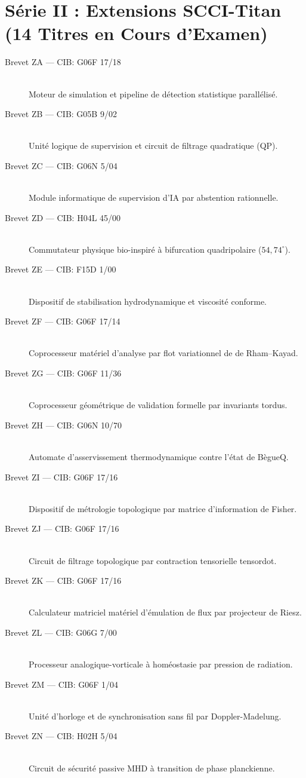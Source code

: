 \section*{Série II : Extensions SCCI-Titan (14 Titres en Cours d'Examen)}
\begin{description}
    \item[Brevet ZA --- CIB: G06F 17/18] \hfill \\ Moteur de simulation et pipeline de détection statistique parallélisé.
    \item[Brevet ZB --- CIB: G05B 9/02] \hfill \\ Unité logique de supervision et circuit de filtrage quadratique (QP).
    \item[Brevet ZC --- CIB: G06N 5/04] \hfill \\ Module informatique de supervision d'IA par abstention rationnelle.
    \item[Brevet ZD --- CIB: H04L 45/00] \hfill \\ Commutateur physique bio-inspiré à bifurcation quadripolaire ($54,74^\circ$).
    \item[Brevet ZE --- CIB: F15D 1/00] \hfill \\ Dispositif de stabilisation hydrodynamique et viscosité conforme.
    \item[Brevet ZF --- CIB: G06F 17/14] \hfill \\ Coprocesseur matériel d'analyse par flot variationnel de de Rham–Kayad.
    \item[Brevet ZG --- CIB: G06F 11/36] \hfill \\ Coprocesseur géométrique de validation formelle par invariants tordus.
    \item[Brevet ZH --- CIB: G06N 10/70] \hfill \\ Automate d'asservissement thermodynamique contre l'état de BègueQ.
    \item[Brevet ZI --- CIB: G06F 17/16] \hfill \\ Dispositif de métrologie topologique par matrice d'information de Fisher.
    \item[Brevet ZJ --- CIB: G06F 17/16] \hfill \\ Circuit de filtrage topologique par contraction tensorielle tensordot.
    \item[Brevet ZK --- CIB: G06F 17/16] \hfill \\ Calculateur matriciel matériel d'émulation de flux par projecteur de Riesz.
    \item[Brevet ZL --- CIB: G06G 7/00] \hfill \\ Processeur analogique-vorticale à homéostasie par pression de radiation.
    \item[Brevet ZM --- CIB: G06F 1/04] \hfill \\ Unité d'horloge et de synchronisation sans fil par Doppler-Madelung.
    \item[Brevet ZN --- CIB: H02H 5/04] \hfill \\ Circuit de sécurité passive MHD à transition de phase planckienne.
\end{description}
